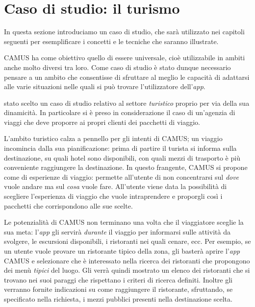 \section{Caso di studio: il turismo\label{sec:caso-studio-turismo}}

In questa sezione introduciamo un caso di studio, che sarà utilizzato nei capitoli seguenti per esemplificare i concetti e le tecniche che saranno illustrate. 

CAMUS ha come obiettivo quello di essere universale, cioè utilizzabile in ambiti anche molto diversi tra loro. Come caso di studio è stato dunque necessario pensare a un ambito che consentisse di sfruttare al meglio le capacità di adattarsi alle varie situazioni nelle quali si può trovare l'utilizzatore dell'\emph{app}.

\upe stato scelto un caso di studio relativo al settore \emph{turistico} proprio per via della sua dinamicità. In particolare si è preso in considerazione il caso di un'agenzia di viaggi che deve proporre ai propri clienti dei pacchetti di viaggio.

L'ambito turistico calza a pennello per gli intenti di CAMUS; un viaggio incomincia dalla sua pianificazione: prima di partire il turista si informa sulla destinazione, su quali hotel sono disponibili, con quali mezzi di trasporto è più conveniente raggiungere la destinazione. In questo frangente, CAMUS si propone come  di esperienze di viaggio: permette all'utente di non concentrarsi sul \emph{dove} vuole andare ma sul \emph{cosa} vuole fare. All'utente viene data la possibilità di scegliere l'esperienza di viaggio che vuole intraprendere e proporgli così i pacchetti che corrispondono alle sue scelte.

Le potenzialità di CAMUS non terminano una volta che il viaggiatore sceglie la sua meta: l'\emph{app} gli servirà \emph{durante} il viaggio per informarsi sulle attività da svolgere, le escursioni disponibili, i ristoranti nei quali cenare, ecc. Per esempio, se un utente vuole provare un ristorante tipico della zona, gli basterà aprire l'\emph{app} CAMUS e selezionare che è interessato nella ricerca dei ristoranti che propongono dei menù \emph{tipici} del luogo. Gli verrà quindi mostrato un elenco dei ristoranti che si trovano nei suoi paraggi che rispettano i criteri di ricerca definiti. Inoltre gli verranno fornite indicazioni su come raggiungere il ristorante, sfruttando, se specificato nella richiesta, i mezzi pubblici presenti nella destinazione scelta.

